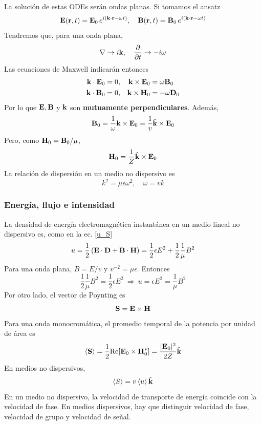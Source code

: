 \documentclass[]{article}
\numberwithin{equation}{section}
\begin{document}
La solución de estas ODEs serán ondas planas. Si tomamos el ansatz
\begin{equation}
	\mathbf{E}(\mathbf{r},t) = \mathbf{E}_0 \, e^{i(\mathbf{k}\cdot\mathbf{r} - \omega t)}, \quad \mathbf{B}(\mathbf{r},t) = \mathbf{B}_0 \, e^{i(\mathbf{k}\cdot\mathbf{r} - \omega t)}
\end{equation}
Tendremos que, para una onda plana,
\begin{equation}
	\nabla \to i\mathbf{k}, \quad \dfrac{\partial }{\partial t} \to -i\omega
\end{equation}
Las ecuaciones de Maxwell indicarán entonces
\begin{align*}
	\mathbf{k}\cdot\mathbf{E}_0 &= 0, & \mathbf{k}\times\mathbf{E}_0 &=  \omega\mathbf{B}_0\\
	\mathbf{k}\cdot\mathbf{B}_0 &= 0, & \mathbf{k}\times\mathbf{H}_0 &= -\omega\mathbf{D}_0
\end{align*}
Por lo que $\mathbf{E}, \mathbf{B}$ y $\mathbf{k}$ son \textbf{mutuamente perpendiculares}. Además,
\begin{equation}
	\mathbf{B}_0 = \frac{1}{\omega} \mathbf{k}\times\mathbf{E}_0 = \frac{1}{v}\hat{\mathbf{k}}\times\mathbf{E}_0
\end{equation}
Pero, como $\mathbf{H}_0 = \mathbf{B}_0/\mu$,
\begin{equation}
	\mathbf{H}_0 = \frac{1}{Z} \hat{\mathbf{k}}\times\mathbf{E}_0
\end{equation}
La relación de dispersión en un medio no dispersivo es
\begin{equation}
	k^2 = \mu\epsilon\omega^2, \quad \omega = v k
\end{equation}

\subsubsection{Energía, flujo e intensidad}
La densidad de energía electromagnética instantánea en un medio lineal no dispersivo es, como en la ec. \ref{u_S}
\begin{equation*}
	u = \frac{1}{2}\left(\mathbf{E}\cdot\mathbf{D} + \mathbf{B}\cdot\mathbf{H}\right) = \frac{1}{2} \epsilon E^2 + \frac{1}{2} \frac{1}{\mu} B^2
\end{equation*}
Para una onda plana, $B = E/v$ y $v^{-2} = \mu\epsilon$. Entonces
\begin{equation*}
	\frac{1}{2} \frac{1}{\mu} B^2 = \frac{1}{2} \epsilon E^2 ~\Rightarrow~ u = \epsilon E^2 = \frac{1}{\mu} B^2
\end{equation*}
Por otro lado, el vector de Poynting es
\begin{equation*}
	\mathbf{S} = \mathbf{E}\times\mathbf{H}
\end{equation*}
Para una onda monocromática, el promedio temporal de la potencia por unidad de área es
\begin{equation}
	\left\langle \mathbf{S} \right\rangle = \frac{1}{2} \mathrm{Re}\!\left[{\mathbf{E}_0\times\mathbf{H}^*_0}\right] = \frac{|\mathbf{E}_0|^2}{2 Z}\hat{\mathbf{k}}
\end{equation}
En medios no dispersivos,
\begin{equation}
	\left\langle S \right\rangle = v \left\langle u \right\rangle \hat{\mathbf{k}}
\end{equation}
En un medio no dispersivo, la velocidad de transporte de energía coincide con la velocidad de fase. En medios dispersivos, hay que distinguir velocidad de fase, velocidad de grupo y velocidad de señal.
\end{document}
